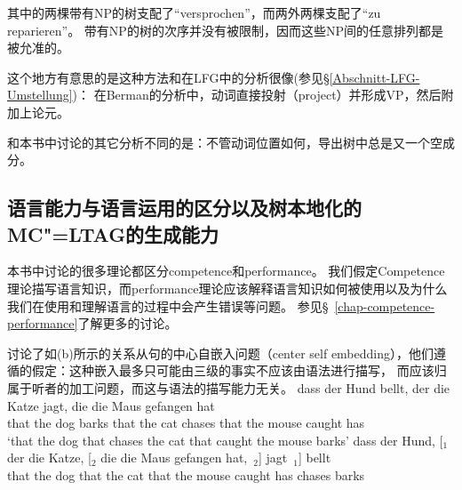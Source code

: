 其中的两棵带有NP的树支配了``{versprochen}''，而两外两棵支配了``{zu reparieren}''。
带有NP的树的次序并没有被限制，因而这些NP间的任意排列都是被允准的。\pagebreak

这个地方有意思的是这种方法和\citet[Section~2.1.3]{Berman96a-u}在LFG\indexlfg 中的分析很像(参见\S \ref{Abschnitt-LFG-Umstellung})：
在Berman的分析中，动词直接投射（project）并形成VP，然后附加上论元。

和本书中讨论的其它分析不同的是：不管动词位置如何，导出树中总是又一个空成分。

\subsection{语言能力与语言运用的区分以及树本地化的MC"=LTAG的生成能力}
\label{Abschnitt-Kompetenz-Performanz-TAG}

本书中讨论的很多理论都区分competence和performance\citep[Section~I.1]{Chomsky65a}。
我们假定Competence理论描写语言知识，而performance理论应该解释语言知识如何被使用以及为什么我们在使用和理解语言的过程中会产生错误等问题。
参见\S~\ref{chap-competence-performance}了解更多的讨论。 

\citet*{JBR2000a}讨论了如(b)所示的关系从句的中心自嵌入问题（center self embedding），他们遵循\citet[]{CM63a}的假定：这种嵌入最多只可能由三级的事实不应该由语法进行描写，
而应该归属于听者的加工问题，而这与语法的描写能力无关。
\eal
\label{TAG-Beispiel-Performanz}
\ex 
\gll dass der Hund bellt, der  die Katze jagt,  die  die Maus  gefangen hat\\
     that the dog  barks  that the cat   chases that the mouse caught   has\\
\glt `that the dog that chases the cat that caught the mouse barks'
\ex 
\gll dass der Hund, [$_1$ der  die Katze, [$_2$ die  die Maus  gefangen hat,~$_2$] jagt~$_1$] bellt\\
     that the dog   {}    that the cat    {}    that the mouse caught   has        chases    barks\\
\zl

